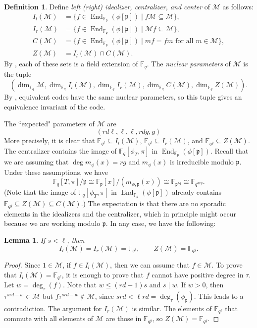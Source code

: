 \documentclass[12pt]{amsart}
\newtheorem{lem}[thm]{Lemma}
\theoremstyle{definition}
\newtheorem{defn}[thm]{Definition}
\theoremstyle{remark}
\numberwithin{equation}{section}
\numberwithin{thm}{section}
\DeclareMathOperator{\End}{End}
\newcommand{\fp}{\mathfrak{p}}
\newcommand{\cM}{\mathcal{M}}
\newcommand{\F}{\mathbb{F}}
\begin{document}
\begin{defn}\label{defNP}
Define \textit{left (right) idealizer, centralizer, and center} of $\cM$ as follows:  
\begin{align*}
	I_l(\cM) &=\{f\in \End_{\F_\fp}(\phi[\fp])\mid f\cM\subseteq \cM\},\\ 
	I_r(\cM) &=\{f\in \End_{\F_\fp}(\phi[\fp])\mid \cM f\subseteq \cM\},\\ 
	C(\cM) &=\{f\in \End_{\F_\fp}(\phi[\fp])\mid mf=fm \text{ for all }m\in \cM\},\\ 
	Z(\cM) &=I_l(\cM)\cap C(\cM). 
\end{align*}
By \cite[p. 436]{Sheekey}, each of these sets is a field extension of $\F_q$. 
The \textit{nuclear parameters} of $\cM$ is the tuple
\[
(\dim_{\F_q}\cM, \dim_{\F_q} 	I_l(\cM),  \dim_{\F_q} 	I_r(\cM),  \dim_{\F_q} 	C(\cM),  \dim_{\F_q} 	Z(\cM)). 
\]
By \cite[Prop. 4]{Sheekey}, equivalent codes have the same nuclear parameters, so this tuple gives an 
equivalence invariant of the code. 
\end{defn}


The ``expected" parameters of $\cM$ are 
\[
\boxed{(rd\ell, \ell, \ell, rdg, g)}
\]
More precisely, it is clear that $\F_{q^\ell}\subseteq I_l(\cM)$, $\F_{q^\ell}\subseteq I_r(\cM)$, and $\F_{q^g}\subseteq Z(\cM)$. 
The centralizer contains the image of $\F_{q}[\phi_T, \pi]$ in $\End_{\F_\fp}(\phi[\fp])$. 
Recall that we are assuming that $\deg m_\phi(x)=rg$ and $m_\phi(x)$ 
is irreducible modulo $\fp$. Under these assumptions, we have 
\[\F_{q}[T, \pi]/\fp\cong \F_\fp[x]/(\overline{m}_{\phi, \fp}(x))\cong \F_{\fp^{rg}}\cong \F_{q^{drg}}. 
\]
(Note that the image of $\F_{q}[\phi_T, \pi]$ in $\End_{\F_\fp}(\phi[\fp])$ already contains  $\F_{q^g}\subseteq Z(\cM)\subseteq C(\cM)$.) 
The expectation is that there are no sporadic elements in the idealizers and the centralizer, which in principle might occur because we are working modulo $\fp$. In any case, we have the following: 


\begin{lem} If $s< \ell$, then 
\[ 
	I_l(\cM)=I_r(\cM)=\F_{q^\ell}, \qquad Z(\cM)=\F_{q^g}. 
\]
\end{lem}
\begin{proof} Since $1\in \cM$, if $f\in I_l(\cM)$, then we can assume that $f\in \cM$. To prove that 
	$I_l(\cM)=\F_{q^\ell}$, it is enough to prove that $f$ cannot have positive degree in $\tau$. Let $w=\deg_\tau(f)$. 
	Note that $w\leq (rd-1)s$ and $s\mid w$.  
	If $w>0$, then $\tau^{srd-w}\in \cM$ but $f \tau^{srd-w}\not\in \cM$, since $srd<\ell rd=\deg_\tau(\phi_\fp)$. This 
	leads to a contradiction. The argument for $I_r(\cM)$ is similar. 
	The elements of $\F_{q^\ell}$ that commute with all elements of $\cM$ are those in $\F_{q^g}$, so $Z(\cM)=\F_{q^g}$. 
\end{proof}
\end{document}
